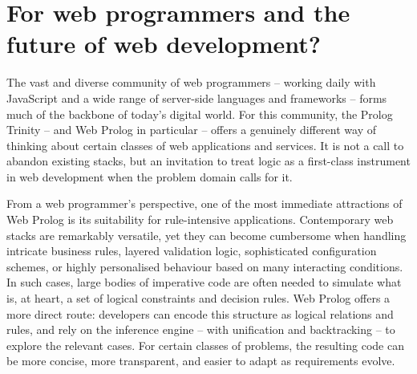%


\section{For web programmers and the future of web development?}\label{sec:for-web-programmers}

The vast and diverse community of web programmers -- working daily with JavaScript and a wide range of server-side languages and frameworks -- forms much of the backbone of today's digital world. For this community, the Prolog Trinity -- and Web Prolog in particular -- offers a genuinely different way of thinking about certain classes of web applications and services. It is not a call to abandon existing stacks, but an invitation to treat logic as a first-class instrument in web development when the problem domain calls for it.

From a web programmer's perspective, one of the most immediate attractions of Web Prolog is its suitability for rule-intensive applications. Contemporary web stacks are remarkably versatile, yet they can become cumbersome when handling intricate business rules, layered validation logic, sophisticated configuration schemes, or highly personalised behaviour based on many interacting conditions. In such cases, large bodies of imperative code are often needed to simulate what is, at heart, a set of logical constraints and decision rules. Web Prolog offers a more direct route: developers can encode this structure as logical relations and rules, and rely on the inference engine -- with unification and backtracking -- to explore the relevant cases. For certain classes of problems, the resulting code can be more concise, more transparent, and easier to adapt as requirements evolve.

